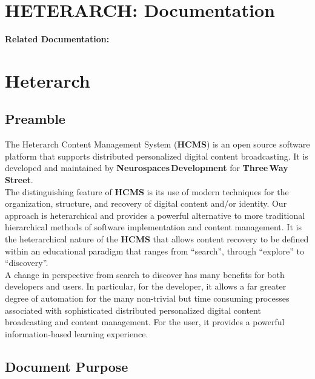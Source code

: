 \documentclass[12pt]{article}
\begin{document}
\section*{HETERARCH: Documentation}

{\bf Related Documentation:}

\section*{Heterarch}

\subsection*{Preamble}

The Heterarch Content Management System ({\bf \small HCMS}) is an open source software platform that supports distributed personalized digital content broadcasting. It is developed and maintained by {\bf Neurospaces\,Development} for {\bf Three\,Way\,Street}.\\
The distinguishing feature of {\bf \small HCMS} is its use of modern techniques for the organization, structure, and recovery of digital content and/or identity. Our approach is heterarchical and provides a powerful alternative to more traditional hierarchical methods of software implementation and content management. It is the heterarchical nature of the {\bf \small HCMS} that allows content recovery to be defined within an educational paradigm that ranges from ``search'', through ``explore'' to ``discovery''.\\
A change in perspective from search to discover has many benefits for both developers and users. In particular, for the developer, it allows a far greater degree of automation for the many non-trivial but time consuming processes associated with sophisticated distributed personalized digital content broadcasting and content management. For the user, it provides a powerful information-based learning experience.

\subsection*{Document Purpose}
\end{document}
